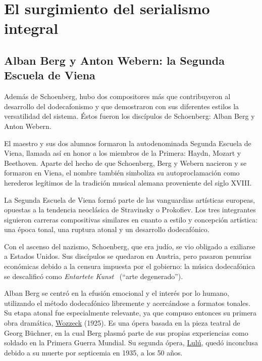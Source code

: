 \section{El surgimiento del serialismo integral}\label{ch:serialismo}
	\subsection{Alban Berg y Anton Webern: la Segunda Escuela de Viena}
	\label{berweb}
	Adem\'as de Schoenberg, hubo dos compositores m\'as que contribuyeron al desarrollo del dodecafonismo y que demostraron con sus diferentes estilos la versatilidad del sistema. \'Estos fueron los disc\'ipulos de Schoenberg: Alban Berg y Anton Webern. 
	
	El maestro y sus dos alumnos formaron la autodenominada Segunda Escuela de Viena, llamada as\'i en honor a los miembros de la Primera: Haydn, Mozart y Beethoven. Aparte del hecho de que Schoenberg, Berg y Webern nacieron y se formaron en Viena, el nombre tambi\'en simboliza su autoproclamaci\'on como herederos leg\'itimos de la tradici\'on musical alemana proveniente del siglo XVIII.
	
	La Segunda Escuela de Viena form\'o parte de las vanguardias art\'isticas europeas, opuestas a la tendencia neocl\'asica de Stravinsky o Prokofiev. Los tres integrantes siguieron carreras compositivas similares en cuanto a estilo y concepci\'on art\'istica: una \'epoca tonal, una ruptura atonal y un desarrollo dodecaf\'onico.
	
	Con el ascenso del nazismo, Schoenberg, que era jud\'io, se vio obligado a exiliarse a Estados Unidos. Sus disc\'ipulos se quedaron en Austria, pero pasaron penurias econ\'omicas debido a la censura impuesta por el gobierno: la m\'usica dodecaf\'onica se descalific\'o como \emph{Entartete Kunst}~\cite{entartete} (``arte degenerado'').
	
	Alban Berg se centr\'o en la efusi\'on emocional y el inter\'es por lo humano, utilizando el m\'etodo dodecaf\'onico libremente y acerc\'andose a formatos tonales. Su etapa atonal fue especialmente relevante, ya que compuso entonces su primera obra dram\'atica, \href{https://www.youtube.com/watch?v=rHFFPyU41_0}{Wozzeck} (1925). Es una \'opera basada en la pieza teatral de Georg B\"uchner, en la cual Berg plasm\'o parte de sus propias experiencias como soldado en la Primera Guerra Mundial. Su segunda \'opera, \href{https://www.youtube.com/watch?v=bLuLsFjnCjI}{Lul\'u}, qued\'o inconclusa debido a su muerte por septicemia en 1935, a los 50 a\~nos.
	
